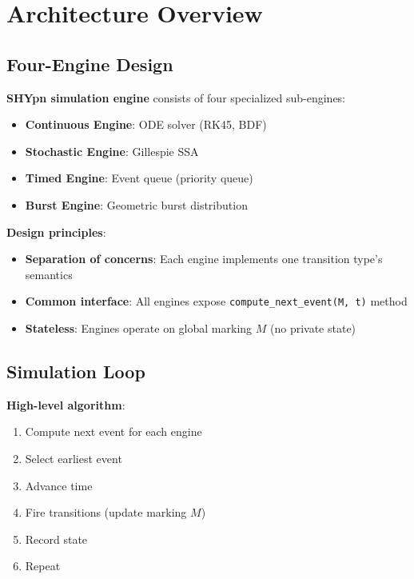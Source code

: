\section{Architecture Overview}
\label{sec:simulation-architecture}

\subsection{Four-Engine Design}
\label{subsec:four-engine-design}

\textbf{SHYpn simulation engine} consists of four specialized sub-engines:

\begin{itemize}
    \item \textbf{Continuous Engine}: ODE solver (RK45, BDF)
    \item \textbf{Stochastic Engine}: Gillespie SSA
    \item \textbf{Timed Engine}: Event queue (priority queue)
    \item \textbf{Burst Engine}: Geometric burst distribution
\end{itemize}

\textbf{Design principles}:

\begin{itemize}
    \item \textbf{Separation of concerns}: Each engine implements one transition type's semantics
    \item \textbf{Common interface}: All engines expose \texttt{compute\_next\_event(M, t)} method
    \item \textbf{Stateless}: Engines operate on global marking $M$ (no private state)
\end{itemize}

\subsection{Simulation Loop}
\label{subsec:simulation-loop}

\textbf{High-level algorithm}:

\begin{enumerate}
    \item Compute next event for each engine
    \item Select earliest event
    \item Advance time
    \item Fire transitions (update marking $M$)
    \item Record state
    \item Repeat
\end{enumerate}


